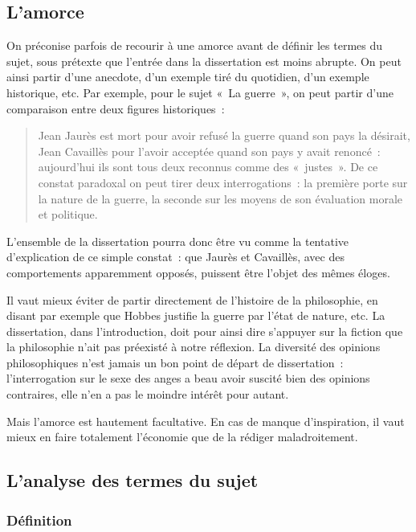 \documentclass[a4paper]{article}
\begin{document}
\subsection{L'amorce}
\label{sec-2-1}


On préconise parfois de recourir à une amorce avant de définir les
termes du sujet, sous prétexte que l'entrée dans la dissertation est
moins abrupte. On peut ainsi partir d'une anecdote, d'un exemple tiré du
quotidien, d'un exemple historique, etc. Par exemple, pour le sujet « La
guerre », on peut partir d'une comparaison entre deux figures
historiques :

\begin{quote}
Jean Jaurès est mort pour avoir refusé la guerre quand son pays la
désirait, Jean Cavaillès pour l'avoir acceptée quand son pays y avait
renoncé : aujourd'hui ils sont tous deux reconnus comme des « justes ».
De ce constat paradoxal on peut tirer deux interrogations : la
première porte sur la nature de la guerre, la seconde sur les moyens
de son évaluation morale et politique.
\end{quote}

L'ensemble de la dissertation pourra donc être vu comme la tentative
d'explication de ce simple constat : que Jaurès et Cavaillès, avec des
comportements apparemment opposés, puissent être l'objet des mêmes
éloges.

Il vaut mieux éviter de partir directement de l'histoire de la
philosophie, en disant par exemple que Hobbes justifie la guerre par
l'état de nature, etc. La dissertation, dans l'introduction, doit pour
ainsi dire s'appuyer sur la fiction que la philosophie n'ait pas
préexisté à notre réflexion. La diversité des opinions philosophiques
n'est jamais un bon point de départ de dissertation : l'interrogation
sur le sexe des anges a beau avoir suscité bien des opinions contraires,
elle n'en a pas le moindre intérêt pour autant.

Mais l'amorce est hautement facultative. En cas de manque d'inspiration,
il vaut mieux en faire totalement l'économie que de la rédiger
maladroitement.
\subsection{L'analyse des termes du sujet}
\label{sec-2-2}
\subsubsection{Définition}
\label{sec-2-2-1}
\end{document}
